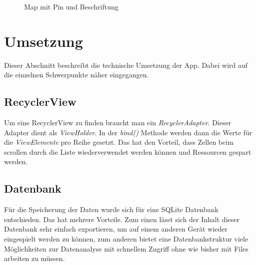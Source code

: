\documentclass[
    DIV12,
    cleardouble=plain,
    headings=normal,
    pdftex,
    headexclude,footexclude,
    final
]{scrreprt}
\begin{document}
\begin{figure}[H]
	\centering
	\caption{Map mit Pin und Beschriftung}
	\label{Map mit Pin und Beschriftung}
\end{figure}



\chapter{Umsetzung}
Dieser Abschnitt beschreibt die technische Umsetzung der App. Dabei wird auf die einzelnen Schwerpunkte näher eingegangen.

\section{RecyclerView}
Um eine RecyclerView zu finden braucht man ein \textit{RecyclerAdapter}. Dieser Adapter dient als \textit{ViewHolder}. In der \textit{bind()} Methode werden dann die Werte für die \textit{ViewElemente} pro Reihe gesetzt. 
Das hat den Vorteil, dass Zellen beim scrollen durch die Liste wiederverwendet werden können und Ressourcen gespart werden.

\section{Datenbank}
	Für die Speicherung der Daten wurde sich für eine SQLite Datenbank entschieden. Das hat mehrere Vorteile. Zum einen lässt sich der Inhalt dieser Datenbank sehr einfach exportieren, um auf einem anderen Gerät wieder eingespielt werden zu können, zum anderen bietet eine Datenbankstruktur viele Möglichkeiten zur Datenanalyse mit schnellem Zugriff ohne wie bisher mit Files arbeiten zu müssen.
\end{document}
